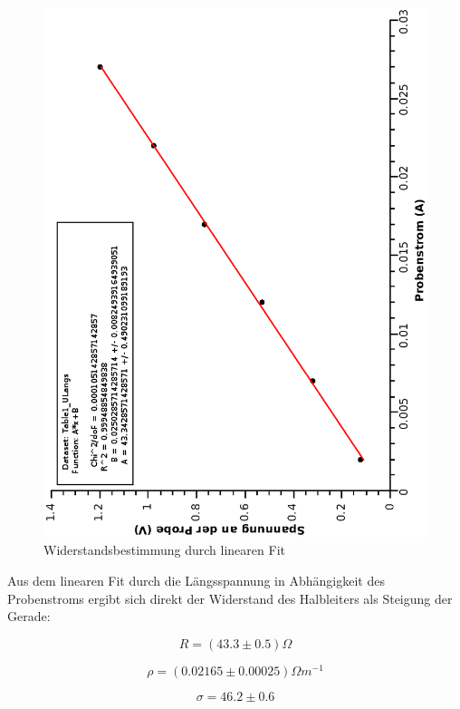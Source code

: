 \documentclass[12pt,a4paper,twopage]{article}
\begin{document}
\subsection*{}

\begin{figure}
\begin{center}

\includegraphics[width=0.4\linewidth, angle=-90]{widerstand.eps}
\caption{Widerstandsbestimmung durch linearen Fit}
\end{center}
\end{figure}

Aus dem linearen Fit durch die Längsspannung in Abhängigkeit des Probenstroms ergibt sich direkt der Widerstand des Halbleiters als Steigung der Gerade:

\begin{center}


$$R = (43.3 \pm 0.5) \Omega $$

$$\rho = (0.02165 \pm 0.00025) \Omega m^{-1} $$

$$\sigma =  46.2 \pm 0.6 $$  

\end{center}
\end{document}
